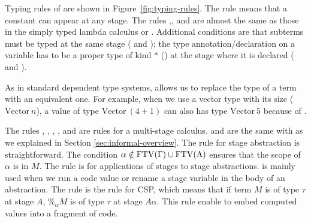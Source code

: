 Typing rules of \LMD are shown in Figure~\ref{fig:typing-rules}.
The rule \TConst{} means that a constant can appear at any stage.
The rules \TVar,\TAbs, and \TApp{} are almost the same as those in the simply typed
lambda calculus or \LLF.  Additional conditions are that subterms must be
typed at the same stage (\TAbs{} and \TApp); the type
annotation/declaration on a variable has to be a proper type of kind
$*$ (\TAbs) at the stage where it is declared (\TVar{} and \TAbs).



As in standard dependent type systems, \TConv{} allows us to replace the type of a term with an equivalent one.
For example, when we use a vector type with its size ($\textrm{Vector}\ n$),
a value of type $\textrm{Vector}\ (4+1)$ can also has type $\textrm{Vector}\ 5$ because of \TConv{}.

The rules \TTB, \TTBL, \TGen, \TIns, and \TCsp{} are rules for a multi-stage calculus.
\TTB and \TTBL are the same with \LTP as we explained in Section \ref{sec:informal-overview}.
The rule \TGen{} for stage abstraction is straightforward.
The condition $\alpha\notin\rm{FTV}(\Gamma)\cup\rm{FTV}(A)$ ensures that the scope of $\alpha$ is in $M$.
The rule \TIns{} is for applications of stages to stage abstractions.
\TIns{} is mainly used when we run a code value or rename a stage variable in the body of an abstraction.
The rule \TCsp{} is the rule for CSP, which means that
if term $M$ is of type $\tau$ at stage $A$, $\%_\alpha M$ is of type $\tau$ at stage $A\alpha$.
This rule enable to embed computed values into a fragment of code.

